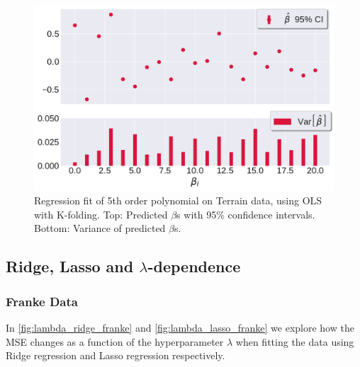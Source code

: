 \documentclass[10pt, twocolumn]{article}
\begin{document}
\begin{figure}[h!]
    \centering
    \includegraphics[scale=0.4]{../figs/CI_Terrain.pdf}
    \caption{Regression fit of 5th order polynomial on Terrain data, using OLS with K-folding. Top: Predicted $\beta$s with 95\% confidence intervals. Bottom: Variance of predicted $\beta$s.}
    \label{fig:CI_Terrain}
\end{figure}



\subsection{Ridge, Lasso and $\lambda$-dependence}
\subsubsection{Franke Data}
In \cref{fig:lambda_ridge_franke} and \cref{fig:lambda_lasso_franke} we explore how the MSE changes as a function of the hyperparameter $\lambda$ when fitting the data using Ridge regression and Lasso regression respectively. 
\end{document}
